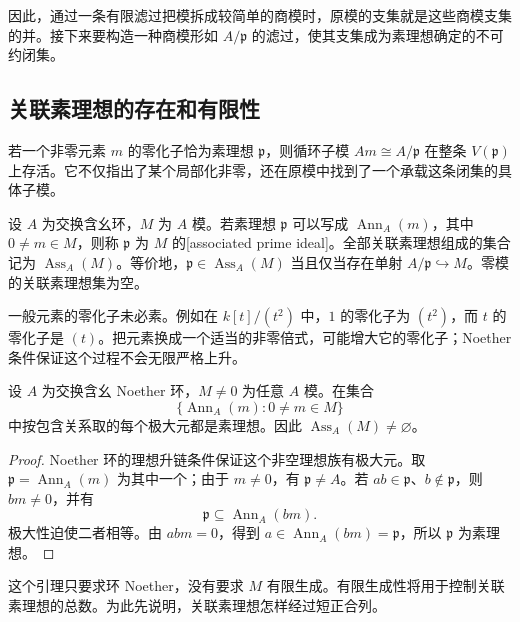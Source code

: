 因此，通过一条有限滤过把模拆成较简单的商模时，原模的支集就是这些商模支集的并。接下来要构造一种商模形如 \(A/\mathfrak p\) 的滤过，使其支集成为素理想确定的不可约闭集。

\subsection{关联素理想的存在和有限性}
\label{g5:subsec:0204:02}
若一个非零元素 \(m\) 的零化子恰为素理想 \(\mathfrak p\)，则循环子模 \(Am\cong A/\mathfrak p\) 在整条 \(V(\mathfrak p)\) 上存活。它不仅指出了某个局部化非零，还在原模中找到了一个承载这条闭集的具体子模。

\begin{definition}\label{g5:def:associated-prime}
	设 \(A\) 为交换含幺环，\(M\) 为 \(A\) 模。若素理想 \(\mathfrak p\) 可以写成 \(\operatorname{Ann}_A(m)\)，其中 \(0\ne m\in M\)，则称 \(\mathfrak p\) 为 \(M\) 的[associated prime ideal]。全部关联素理想组成的集合记为 \(\operatorname{Ass}_A(M)\)。等价地，\(\mathfrak p\in\operatorname{Ass}_A(M)\) 当且仅当存在单射 \(A/\mathfrak p\hookrightarrow M\)。零模的关联素理想集为空。
\end{definition}

一般元素的零化子未必素。例如在 \(k[t]/(t^2)\) 中，\(1\) 的零化子为 \((t^2)\)，而 \(t\) 的零化子是 \((t)\)。把元素换成一个适当的非零倍式，可能增大它的零化子；Noether 条件保证这个过程不会无限严格上升。

\begin{lemma}\label{g5:lem:associated-prime-exists}
	设 \(A\) 为交换含幺 Noether 环，\(M\ne0\) 为任意 \(A\) 模。在集合
	\[
		\{\operatorname{Ann}_A(m):0\ne m\in M\}
	\]
	中按包含关系取的每个极大元都是素理想。因此 \(\operatorname{Ass}_A(M)\ne\varnothing\)。
\end{lemma}
\begin{proof}
	Noether 环的理想升链条件保证这个非空理想族有极大元。取 \(\mathfrak p=\operatorname{Ann}_A(m)\) 为其中一个；由于 \(m\ne0\)，有 \(\mathfrak p\ne A\)。若 \(ab\in\mathfrak p\)、\(b\notin\mathfrak p\)，则 \(bm\ne0\)，并有
	\[
		\mathfrak p\subseteq\operatorname{Ann}_A(bm).
	\]
	极大性迫使二者相等。由 \(abm=0\)，得到 \(a\in\operatorname{Ann}_A(bm)=\mathfrak p\)，所以 \(\mathfrak p\) 为素理想。
\end{proof}

这个引理只要求环 Noether，没有要求 \(M\) 有限生成。有限生成性将用于控制关联素理想的总数。为此先说明，关联素理想怎样经过短正合列。

